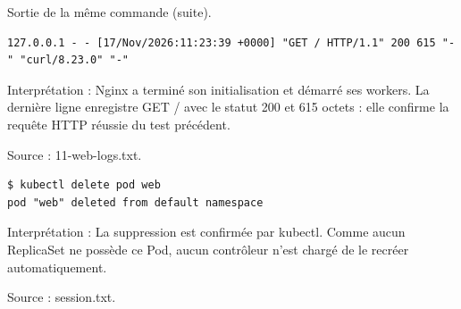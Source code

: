 \documentclass[11pt,a4paper]{article}
\begin{document}
\par\medskip\noindent\begin{minipage}{\linewidth}
Sortie de la même commande (suite).

\par\vspace{4pt}\noindent\begin{minipage}{\linewidth}
\begin{Verbatim}[breaklines=true,breakanywhere=true,fontsize=\footnotesize,frame=single,framesep=8pt,rulecolor=\color{teal}]
127.0.0.1 - - [17/Nov/2026:11:23:39 +0000] "GET / HTTP/1.1" 200 615 "-" "curl/8.23.0" "-"
\end{Verbatim}
\end{minipage}\par\vspace{6pt}

Interprétation : Nginx a terminé son initialisation et démarré ses workers. La dernière ligne enregistre GET / avec le statut 200 et 615 octets : elle confirme la requête HTTP réussie du test précédent.

{\footnotesize\color{teal} Source : 11-web-logs.txt.\par}
\end{minipage}\par\medskip

\par\medskip\noindent\begin{minipage}{\linewidth}
\par\vspace{4pt}\noindent\begin{minipage}{\linewidth}
\begin{Verbatim}[breaklines=true,breakanywhere=true,fontsize=\footnotesize,frame=single,framesep=8pt,rulecolor=\color{teal}]
$ kubectl delete pod web
pod "web" deleted from default namespace
\end{Verbatim}
\end{minipage}\par\vspace{6pt}

Interprétation : La suppression est confirmée par kubectl. Comme aucun ReplicaSet ne possède ce Pod, aucun contrôleur n'est chargé de le recréer automatiquement.

{\footnotesize\color{teal} Source : session.txt.\par}
\end{minipage}\par\medskip
\end{document}
